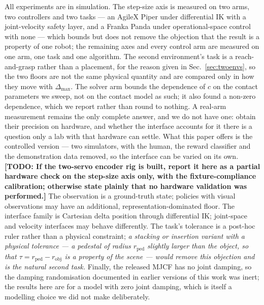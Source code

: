 \documentclass{article}
\newcommand{\todo}[1]{{\color{red}\textbf{[TODO: #1]}}}
\newcommand{\planned}[1]{{\color{blue!70!black}\textit{#1}}}
\newcommand{\dmax}{\Delta_{\max}}
\begin{document}
All experiments are in simulation. The step-size axis is measured on two arms,
two controllers and two tasks --- an AgileX Piper under differential IK with a
joint-velocity safety layer, and a Franka Panda under operational-space control
with none --- which bounds but does not remove the objection that the result is
a property of one robot; the remaining axes and every control arm are measured
on one arm, one task and one algorithm. The second environment's task is a
reach-and-grasp rather than a placement, for the reason given in
Sec.~\ref{sec:twoenvs}, so the two floors are not the same physical quantity
and are compared only in how they move with $\dmax$. The solver arm bounds the
dependence of $c$ on the contact parameters we sweep, not on the contact model
as such; it also found a non-zero dependence, which we report rather than round
to nothing. A real-arm measurement remains the only complete answer, and we do
not have one: \citet{luo2025hilserl} obtain their precision on hardware, and
whether the interface accounts for it there is a question only a lab with that
hardware can settle. What this paper offers is the controlled version --- two
simulators, with the human, the reward classifier and the demonstration data
removed, so the interface can be varied on its own. \todo{If the two-servo encoder rig is
built, report it here as a partial hardware check on the step-size axis only,
with the fixture-compliance calibration; otherwise state plainly that no
hardware validation was performed.} The observation is a ground-truth state;
policies with visual observations may have an additional,
representation-dominated floor. The interface family is Cartesian delta position
through differential IK; joint-space and velocity interfaces
\citep{aljalbout2024role,azimi2026benchmarking} may behave differently. The
task's tolerance is a post-hoc ruler rather than a physical constraint;
\planned{a stacking or insertion variant with a physical tolerance --- a
pedestal of radius $r_{\mathrm{ped}}$ slightly larger than the object, so that
$\tau = r_{\mathrm{ped}} - r_{\mathrm{obj}}$ is a property of the scene ---
would remove this objection and is the natural second task.} Finally, the
released MJCF has no joint damping, so the damping randomisation documented in
earlier versions of this work was inert; the results here are for a model with
zero joint damping, which is itself a modelling choice we did not make
deliberately.

\end{document}
